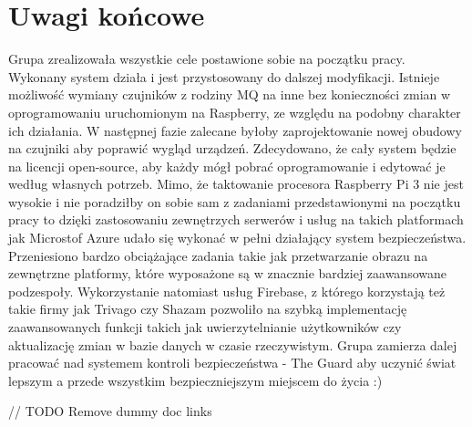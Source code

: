 \chapter{Uwagi końcowe}

Grupa zrealizowała wszystkie cele postawione sobie na początku pracy. Wykonany system działa i jest przystosowany do dalszej modyfikacji. Istnieje możliwość wymiany czujników z rodziny MQ na inne bez konieczności zmian w oprogramowaniu uruchomionym na Raspberry, ze względu na podobny charakter ich działania. W następnej fazie zalecane byłoby zaprojektowanie nowej obudowy na czujniki aby poprawić wygląd urządzeń. Zdecydowano, że cały system będzie na licencji open-source, aby każdy mógł pobrać oprogramowanie i edytować je według własnych potrzeb. Mimo, że taktowanie procesora Raspberry Pi 3 nie jest wysokie i nie poradziłby on sobie sam z zadaniami przedstawionymi na początku pracy to dzięki zastosowaniu zewnętrzych serwerów i usług na takich platformach jak Microstof Azure udało się wykonać w pełni działający system bezpieczeństwa. Przeniesiono bardzo obciążające zadania takie jak przetwarzanie obrazu na zewnętrzne platformy, które wyposażone są w znacznie bardziej zaawansowane podzespoły. Wykorzystanie natomiast usług Firebase, z którego korzystają też takie firmy jak Trivago czy Shazam pozwoliło na szybką implementację zaawansowanych funkcji takich jak uwierzytelnianie użytkowników czy aktualizację zmian w bazie danych w czasie rzeczywistym. Grupa zamierza dalej pracować nad systemem kontroli bezpieczeństwa - The Guard aby uczynić świat lepszym a przede wszystkim bezpieczniejszym miejscem do życia :)


// TODO Remove dummy doc links
\cite{MDESIGN}
\cite{RXJAVA}
\cite{KOTLIN}
\cite{RPI}
\cite{firebase}
\cite{android}
\cite{azure}
\cite{kotlin}